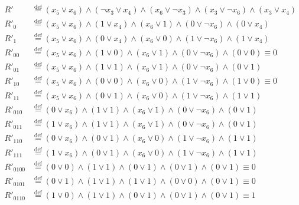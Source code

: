 \documentclass{article}
\newcommand*{\defeq}{\stackrel{\text{def}}{=}}
\begin{document}
\newpage
\begin{align*}
	R'        & \defeq (x_5 \lor x_6) \land (\lnot x_3 \lor x_4) \land (x_6 \lor \lnot x_3) \land (x_3 \lor \lnot x_6) \land (x_3 \lor x_4) \\
	R'_{0}    & \defeq (x_5 \lor x_6) \land (1 \lor x_4) \land (x_6 \lor 1) \land (0 \lor \lnot x_6) \land (0 \lor x_4)                     \\
	R'_{1}    & \defeq (x_5 \lor x_6) \land (0 \lor x_4) \land (x_6 \lor 0) \land (1 \lor \lnot x_6) \land (1 \lor x_4)                     \\
	R'_{00}   & \defeq (x_5 \lor x_6) \land (1 \lor 0) \land (x_6 \lor 1) \land (0 \lor \lnot x_6) \land (0 \lor 0)  \equiv 0               \\
	R'_{01}   & \defeq (x_5 \lor x_6) \land (1 \lor 1) \land (x_6 \lor 1) \land (0 \lor \lnot x_6) \land (0 \lor 1)                         \\
	R'_{10}   & \defeq (x_5 \lor x_6) \land (0 \lor 0) \land (x_6 \lor 0) \land (1 \lor \lnot x_6) \land (1 \lor 0) \equiv 0                \\
	R'_{11}   & \defeq (x_5 \lor x_6) \land (0 \lor 1) \land (x_6 \lor 0) \land (1 \lor \lnot x_6) \land (1 \lor 1)                         \\
	R'_{010}  & \defeq (0 \lor x_6) \land (1 \lor 1) \land (x_6 \lor 1) \land (0 \lor \lnot x_6) \land (0 \lor 1)                           \\
	R'_{011}  & \defeq (1 \lor x_6) \land (1 \lor 1) \land (x_6 \lor 1) \land (0 \lor \lnot x_6) \land (0 \lor 1)                           \\
	R'_{110}  & \defeq (0 \lor x_6) \land (0 \lor 1) \land (x_6 \lor 0) \land (1 \lor \lnot x_6) \land (1 \lor 1)                           \\
	R'_{111}  & \defeq (1 \lor x_6) \land (0 \lor 1) \land (x_6 \lor 0) \land (1 \lor \lnot x_6) \land (1 \lor 1)                           \\
	R'_{0100} & \defeq (0 \lor 0) \land (1 \lor 1) \land (0 \lor 1) \land (0 \lor 1) \land (0 \lor 1) \equiv 0                              \\
	R'_{0101} & \defeq (0 \lor 1) \land (1 \lor 1) \land (1 \lor 1) \land (0 \lor 0) \land (0 \lor 1) \equiv 0                              \\
	R'_{0110} & \defeq (1 \lor 0) \land (1 \lor 1) \land (0 \lor 1) \land (0 \lor 1) \land (0 \lor 1) \equiv 1                              \\

\end{align*}
\end{document}

